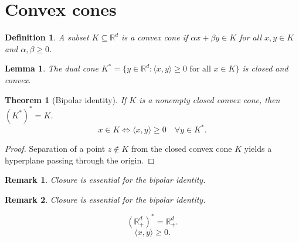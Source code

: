 \documentclass{article}
\newtheorem{theorem}{Theorem}
\newtheorem{lemma}{Lemma}
\newtheorem{definition}{Definition}
\newtheorem{remark}{Remark}
\begin{document}
\section{Convex cones}
\begin{definition}
A subset $K \subseteq \mathbb{R}^d$ is a convex cone if $\alpha x + \beta y \in K$ for all $x,y\in K$ and $\alpha,\beta \ge 0$.
\end{definition}
\begin{lemma}
The dual cone $K^* = \{y \in \mathbb{R}^d : \langle x, y \rangle \ge 0 \text{ for all } x\in K\}$ is closed and convex.
\end{lemma}
\begin{theorem}[Bipolar identity]
If $K$ is a nonempty closed convex cone, then $(K^*)^* = K$.
\[
x \in K \iff \langle x, y \rangle \ge 0 \quad \forall y \in K^*.
\]
\end{theorem}
\begin{proof}
Separation of a point $z \notin K$ from the closed convex cone $K$ yields a hyperplane passing through the origin.
\end{proof}
\begin{remark}
Closure is essential for the bipolar identity.
\end{remark}
\begin{remark}
Closure is essential for the bipolar identity.
\end{remark}
\begin{equation}\label{eq:selfdual}
(\mathbb{R}_+^d)^* = \mathbb{R}_+^d.
\end{equation}
$$
\langle x, y \rangle \ge 0.
$$
\end{document}

